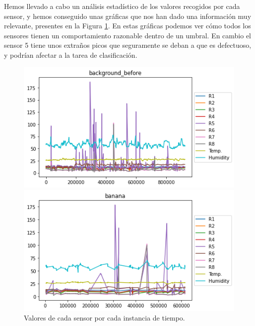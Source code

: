 \documentclass{esannV2}
\begin{document}
\noindent
Hemos llevado a cabo un análisis estadístico de los valores recogidos por cada sensor, y hemos conseguido unas gráficas que nos han dado una información muy relevante, presentes en la Figura \ref{fig:mediasSensoresPorSerie}. En estas gráficas podemos ver cómo todos los sensores tienen un comportamiento razonable dentro de un umbral. En cambio el sensor 5 tiene unos extraños picos que seguramente se deban a que es defectuoso, y podrían afectar a la tarea de clasificación.

\begin{figure}[H]
\centering
\begin{minipage}{.5\textwidth}
  \centering
  \includegraphics[width=\linewidth]{figuras/mediasSensoresPorSerie_background1.png}
\end{minipage}%
\begin{minipage}{.5\textwidth}
  \centering
  \includegraphics[width=\linewidth]{figuras/mediasSensoresPorSerie_banana.png}
\end{minipage}
\caption{Valores de cada sensor por cada instancia de tiempo.}
\label{fig:mediasSensoresPorSerie}
\end{figure}
\end{document}
